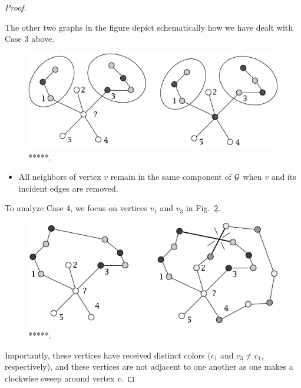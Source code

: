 \begin{proof}
\begin{description}
The other two graphs in the figure depict schematically how we have dealt with Case 3 above.
\begin{figure}[hbt]
\begin{center}
   \includegraphics[scale=0.4]{FiguresGraph/5colorsCase1}
\caption{*****.}
  \label{fig:5colorsCase1}
\end{center}
\end{figure}
\begin{itemize}
\item
All neighbors of vertex $v$ remain in the same component of $\mbox{$\cal G$}$ when $v$ and its incident edges are removed.
\end{itemize}
\end{description}
To analyze Case 4, we focus on vertices $v_1$ and $v_3$ in Fig.~\ref{fig:5colorsCase2}.
\begin{figure}[hbt]
\begin{center}
   \includegraphics[scale=0.4]{FiguresGraph/5colorsCase2}
\caption{*****.}
  \label{fig:5colorsCase2}
\end{center}
\end{figure}
Importantly, these vertices have received distinct colors ($c_1$ and $c_3 \neq c_1$, respectively), and these vertices are not adjacent to one another as one makes a clockwise sweep around vertex $v$.

\smallskip


\end{proof}
